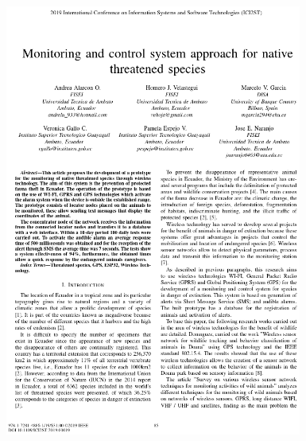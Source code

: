 \begin{figure}[ht]
    \centering
    \includegraphics[width=0.87\textwidth]{5.-Publicaciones/Certificados/3.png}
\end{figure}



